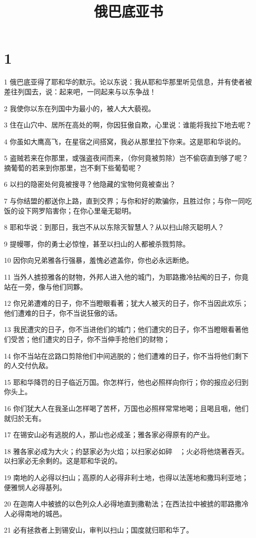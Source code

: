

\title{俄巴底亚书}


\chapter{1}

\par 1 俄巴底亚得了耶和华的默示。论以东说：我从耶和华那里听见信息，并有使者被差往列国去，说：起来吧，一同起来与以东争战！
\par 2 我使你以东在列国中为最小的，被人大大藐视。
\par 3 住在山穴中、居所在高处的啊，你因狂傲自欺，心里说：谁能将我拉下地去呢？
\par 4 你虽如大鹰高飞，在星宿之间搭窝，我必从那里拉下你来。这是耶和华说的。
\par 5 盗贼若来在你那里，或强盗夜间而来，（你何竟被剪除）岂不偷窃直到够了呢？摘葡萄的若来到你那里，岂不剩下些葡萄呢？
\par 6 以扫的隐密处何竟被搜寻？他隐藏的宝物何竟被查出？
\par 7 与你结盟的都送你上路，直到交界；与你和好的欺骗你，且胜过你；与你一同吃饭的设下网罗陷害你；在你心里毫无聪明。
\par 8 耶和华说：到那日，我岂不从以东除灭智慧人？从以扫山除灭聪明人？
\par 9 提幔哪，你的勇士必惊惶，甚至以扫山的人都被杀戮剪除。
\par 10 因你向兄弟雅各行强暴，羞愧必遮盖你，你也必永远断绝。
\par 11 当外人掳掠雅各的财物，外邦人进入他的城门，为耶路撒冷拈阄的日子，你竟站在一旁，像与他们同夥。
\par 12 你兄弟遭难的日子，你不当瞪眼看著；犹大人被灭的日子，你不当因此欢乐；他们遭难的日子，你不当说狂傲的话。
\par 13 我民遭灾的日子，你不当进他们的城门；他们遭灾的日子，你不当瞪眼看著他们受苦；他们遭灾的日子，你不当伸手抢他们的财物；
\par 14 你不当站在岔路口剪除他们中间逃脱的；他们遭难的日子，你不当将他们剩下的人交付仇敌。
\par 15 耶和华降罚的日子临近万国。你怎样行，他也必照样向你行；你的报应必归到你头上。
\par 16 你们犹大人在我圣山怎样喝了苦杯，万国也必照样常常地喝；且喝且咽，他们就归於无有。
\par 17 在锡安山必有逃脱的人，那山也必成圣；雅各家必得原有的产业。
\par 18 雅各家必成为大火；约瑟家必为火焰；以扫家必如碎　；火必将他烧著吞灭。以扫家必无余剩的。这是耶和华说的。
\par 19 南地的人必得以扫山；高原的人必得非利士地，也得以法莲地和撒玛利亚地；便雅悯人必得基列。
\par 20 在迦南人中被掳的以色列众人必得地直到撒勒法；在西法拉中被掳的耶路撒冷人必得南地的城邑。
\par 21 必有拯救者上到锡安山，审判以扫山；国度就归耶和华了。


